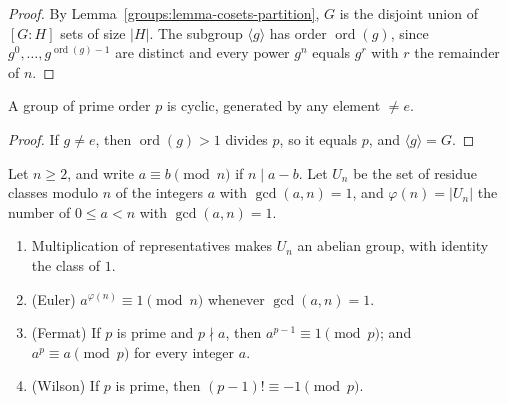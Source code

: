 \begin{proof}
By Lemma~\ref{groups:lemma-cosets-partition}, $G$ is the disjoint union of
$[G:H]$ sets of size $|H|$. The subgroup $\langle g \rangle$ has order
$\operatorname{ord}(g)$, since $g^0, \ldots, g^{\operatorname{ord}(g)-1}$ are
distinct and every power $g^n$ equals $g^r$ with $r$ the remainder of $n$.
\end{proof}

\begin{corollary}\label{groups:corollary-prime-order}
A group of prime order $p$ is cyclic, generated by any element $\neq e$.
\end{corollary}

\begin{proof}
If $g \neq e$, then $\operatorname{ord}(g) > 1$ divides $p$, so it equals $p$, and
$\langle g \rangle = G$.
\end{proof}

\begin{corollary}\label{groups:corollary-euler-fermat}
Let $n \geq 2$, and write $a \equiv b \pmod n$ if $n \mid a - b$. Let $U_n$ be the set of residue classes modulo $n$ of the integers $a$ with $\gcd(a, n) = 1$, and $\varphi(n) = |U_n|$ the number of
$0 \leq a < n$ with $\gcd(a, n) = 1$.
\begin{enumerate}
\item Multiplication of representatives makes $U_n$ an abelian group, with identity the class of $1$.
\item (Euler) $a^{\varphi(n)} \equiv 1 \pmod n$ whenever $\gcd(a, n) = 1$.
\item (Fermat) If $p$ is prime and $p \nmid a$, then $a^{p-1} \equiv 1 \pmod p$; and $a^p \equiv a \pmod p$ for every integer $a$.
\item (Wilson) If $p$ is prime, then $(p - 1)! \equiv -1 \pmod p$.
\end{enumerate}
\end{corollary}

